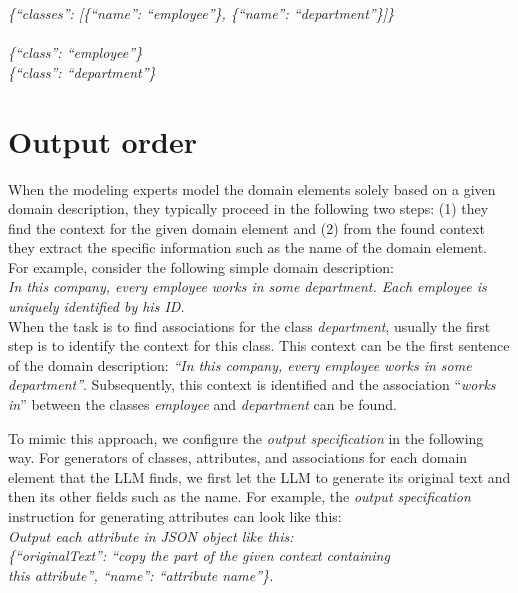 \noindent{}\textit{\{``classes'': [\{``name'': ``employee''\}, \{``name'': ``department''\}]\}} \\

 \\

\noindent{}\textit{\{``class'': ``employee''\} \\
\{``class'': ``department''\}}


\section{Output order}
\label{sec:output_order}

When the modeling experts model the domain elements solely based on a given domain description, they typically proceed in the following two steps: (1) they find the context for the given domain element and (2) from the found context they extract the specific information such as the name of the domain element. For example, consider the following simple domain description: \\

\noindent{}\textit{In this company, every employee works in some department. Each employee is uniquely identified by his ID.} \\

\noindent{}When the task is to find associations for the class \textit{department}, usually the first step is to identify the context for this class. This context can be the first sentence of the domain description: \textit{``In this company, every employee works in some department''}. Subsequently, this context is identified and the association ``\textit{works in}'' between the classes \textit{employee} and \textit{department} can be found.

To mimic this approach, we configure the \emph{output specification} in the following way. For generators of classes, attributes, and associations for each domain element that the LLM finds, we first let the LLM to generate its original text and then its other fields such as the name. For example, the \emph{output specification} instruction for generating attributes can look like this: \\

\noindent{}\textit{Output each attribute in JSON object like this: \\
\{``originalText'': ``copy the part of the given context containing \\ this attribute'', ``name'': ``attribute name''\}.}


